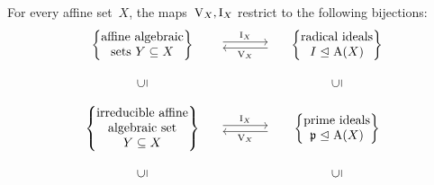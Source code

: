 \begin{theorem}
  \label{nullstellensatz 3}
  For every affine set~$X$, the maps~$\operatorname{V}_X, \operatorname{I}_X$ restrict to the following bijections:
  \[
    \begin{matrix}
        \left\{
          \begin{tabular}{@{}c@{}}
              affine  algebraic \\
              sets~$Y \subseteq X$
          \end{tabular}
        \right\}
      & \begin{tikzcd}[column sep = large]
            {}
            \arrow[shift left]{r}{\videal_X}
          & {}
            \arrow[shift left]{l}{\vset_X}
        \end{tikzcd}
      & \left\{
          \begin{tabular}{@{}c@{}}
            radical ideals \\
            $I \idealleq \coord(X)$
          \end{tabular}
        \right\}
      \\
        {}
      & {}
      & {}
      \\
        \rotatebox[origin=c]{90}{$\subseteq$}
      & {}
      & \rotatebox[origin=c]{90}{$\subseteq$}
      \\
        {}
      & {}
      & {}
      \\
        \left\{
          \begin{tabular}{@{}c@{}}
              irreducible affine \\
              algebraic set \\
              $Y \subseteq X$
          \end{tabular}
        \right\}
      & \begin{tikzcd}[column sep = large]
            {}
            \arrow[shift left]{r}{\videal_X}
          & {}
            \arrow[shift left]{l}{\vset_X}
        \end{tikzcd}
      & \left\{
          \begin{tabular}{@{}c@{}}
            prime ideals \\
            $\mf{p} \idealleq \coord(X)$
          \end{tabular}
        \right\}
      \\
        {}
      & {}
      & {}
      \\
        \rotatebox[origin=c]{90}{$\subseteq$}
      & {}
      & \rotatebox[origin=c]{90}{$\subseteq$}

\end{matrix}\]
\end{theorem}
